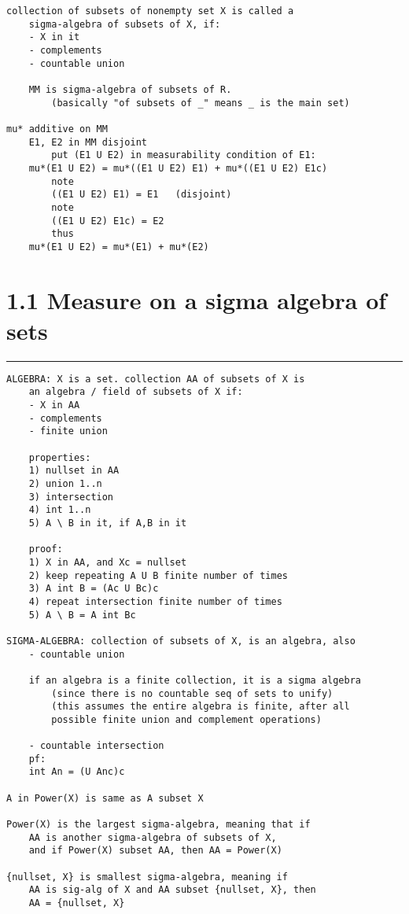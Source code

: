 \documentclass{article}
\begin{document}
\begin{flushleft}
\begin{verbatim}
collection of subsets of nonempty set X is called a 
    sigma-algebra of subsets of X, if:
    - X in it 
    - complements 
    - countable union 

    MM is sigma-algebra of subsets of R.
        (basically "of subsets of _" means _ is the main set)

mu* additive on MM 
    E1, E2 in MM disjoint 
        put (E1 U E2) in measurability condition of E1: 
    mu*(E1 U E2) = mu*((E1 U E2) E1) + mu*((E1 U E2) E1c)
        note 
        ((E1 U E2) E1) = E1   (disjoint)
        note 
        ((E1 U E2) E1c) = E2
        thus 
    mu*(E1 U E2) = mu*(E1) + mu*(E2)
\end{verbatim}

\section*{1.1 Measure on a sigma algebra of sets}
\bigbreak
\hrule
\bigbreak

\begin{verbatim}
ALGEBRA: X is a set. collection AA of subsets of X is 
    an algebra / field of subsets of X if:
    - X in AA 
    - complements 
    - finite union

    properties:
    1) nullset in AA 
    2) union 1..n 
    3) intersection 
    4) int 1..n
    5) A \ B in it, if A,B in it 

    proof:
    1) X in AA, and Xc = nullset 
    2) keep repeating A U B finite number of times 
    3) A int B = (Ac U Bc)c
    4) repeat intersection finite number of times 
    5) A \ B = A int Bc 

SIGMA-ALGEBRA: collection of subsets of X, is an algebra, also 
    - countable union 

    if an algebra is a finite collection, it is a sigma algebra 
        (since there is no countable seq of sets to unify)
        (this assumes the entire algebra is finite, after all 
        possible finite union and complement operations)

    - countable intersection 
    pf: 
    int An = (U Anc)c 

A in Power(X) is same as A subset X 

Power(X) is the largest sigma-algebra, meaning that if 
    AA is another sigma-algebra of subsets of X, 
    and if Power(X) subset AA, then AA = Power(X)

{nullset, X} is smallest sigma-algebra, meaning if 
    AA is sig-alg of X and AA subset {nullset, X}, then 
    AA = {nullset, X}


\end{verbatim}
\end{flushleft}
\end{document}

